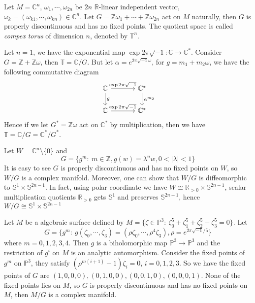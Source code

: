 \begin{eg}
    Let $M=\mathbb{C}^n$, $\omega_1,\cdots,\omega_{2n}$ be $2n$ $\mathbb{R}$-linear independent vector, $\omega_k=(\omega_{k1},\cdots,\omega_{kn})\in\mathbb{C}^n$.
    Let $G=\mathbb{Z}\omega_1+\cdots+\mathbb{Z}\omega_{2n}$ act on $M$ naturally, then $G$ is properly discontinuous and has no fixed points.
    The quotient space is called \emph{compex torus} of dimension $n$, denoted by $\mathbb{T}^n$.

    Let $n=1$, we have the exponential map $\exp{2\pi\sqrt{-1}}:\mathbb{C}\to\mathbb{C}^*$.
    Consider $G=\mathbb{Z}+\mathbb{Z}\omega$, then $\mathbb{T}=\mathbb{C}/G$.
    But let $\alpha=e^{2\pi\sqrt{-1}\omega}$, for $g=m_1+m_2\omega$, we have the following commutative diagram
    \[\begin{tikzcd}
        \mathbb{C} \ar[r, "\exp{2\pi\sqrt{-1}}"] \ar[d, "g"] &[4mm] \mathbb{C}^* \ar[d, "\alpha^{m_2}"] \\
        \mathbb{C} \ar[r, "\exp{2\pi\sqrt{-1}}"] &[4mm] \mathbb{C}^*
    \end{tikzcd}\]
    Hence if we let $G^*=\mathbb{Z}\omega$ act on $\mathbb{C}^*$ by multiplication, then we have $\mathbb{T}=\mathbb{C}/G=\mathbb{C}^*/G^*$.
\end{eg}

\begin{eg}
    Let $W=\mathbb{C}^n\setminus\{0\}$ and
    \[G=\{g^m:\ m\in\mathbb{Z},g(w)=\lambda^nw,0<|\lambda|<1\}\]
    It is easy to see $G$ is properly discontinuous and has no fixed points on $W$, so $W/G$ is a complex manifold.
    Moreover, one can show that $W/G$ is diffeomorphic to $\mathbb{S}^1\times\mathbb{S}^{2n-1}$.
    In fact, using polar coordinate we have $W\cong\mathbb{R}_{>0}\times\mathbb{S}^{2n-1}$, scalar multiplication quotients $\mathbb{R}_{>0}$ gets $\mathbb{S}^1$ and preserves $\mathbb{S}^{2n-1}$, hence $W/G\cong\mathbb{S}^1\times\mathbb{S}^{2n-1}$
\end{eg}

\begin{eg}
    Let $M$ be a algebraic surface defined by $M=\{\zeta\in\mathbb{P}^3:\ \zeta_0^5+\zeta_1^5+\zeta_2^5+\zeta_3^5=0\}$.
    Let
    \[G=\{g^m:\ g(\zeta_0,\cdots,\zeta_3)=(\rho\zeta_0,\cdots,\rho^4\zeta_3),\rho=e^{2\pi\sqrt{-1}/5}\}\]
    where $m=0,1,2,3,4$.
    Then $g$ is a biholomorphic map $\mathbb{P}^3\to\mathbb{P}^3$ and the restriction of $g^i$ on $M$ is an analytic automorphism.
    Consider the fixed points of $g^m$ on $\mathbb{P}^3$, they satisfy $(\rho^{m(i+1)}-1)\zeta_i=0$, $i=0,1,2,3$.
    So we have the fixed points of $G$ are $(1,0,0,0),(0,1,0,0),(0,0,1,0),(0,0,0,1)$.
    None of the fixed points lies on $M$, so $G$ is properly discontinuous and has no fixed points on $M$, then $M/G$ is a complex manifold.
\end{eg}

